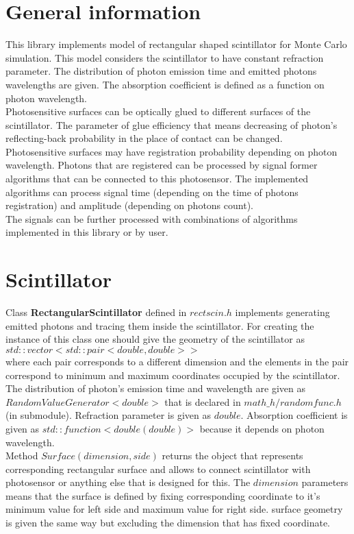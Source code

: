 \documentclass[a4paper]{article}
\begin{document}
\section{General information}
This library implements model of rectangular shaped scintillator for Monte Carlo simulation.
This model considers the scintillator to have constant refraction parameter.
The distribution of photon emission time and emitted photons wavelengths are given.
The absorption coefficient is defined as a function on photon wavelength.
\\
Photosensitive surfaces can be optically glued to different surfaces of the scintillator. 
The parameter of glue efficiency that means decreasing of photon's reflecting-back probability in the place of contact can be changed.
\\
Photosensitive surfaces may have registration probability depending on photon wavelength.
Photons that are registered can be processed by signal former algorithms that can be connected to this photosensor.
The implemented algorithms can process signal time (depending on the time of photons registration) and amplitude (depending on photons count).
\\
The signals can be further processed with combinations of algorithms implemented in this library or by user.
\section{Scintillator}
Class \textbf{RectangularScintillator} defined in $rectscin.h$ implements generating emitted photons and tracing them inside the scintillator.
For creating the instance of this class one should give the geometry of the scintillator as\\
$std::vector<std::pair<double,double>>$\\
where each pair corresponds to a different dimension and the elements in the pair correspond to minimum and maximum coordinates occupied by the scintillator.
The distribution of photon's emission time and wavelength are given as $RandomValueGenerator<double>$ that is declared in $math\_h/randomfunc.h$ (in submodule).
Refraction parameter is given as $double$. 
Absorption coefficient is given as $std::function<double(double)>$ because it depends on photon wavelength.\\
Method $Surface(dimension,side)$ returns the object that represents corresponding rectangular surface and allows to connect scintillator with photosensor or anything else that is designed for this.
The $dimension$ parameters means that the surface is defined by fixing corresponding coordinate to it's minimum value for left side and maximum value for right side.
surface geometry is given the same way but excluding the dimension that has fixed coordinate.
\end{document}
